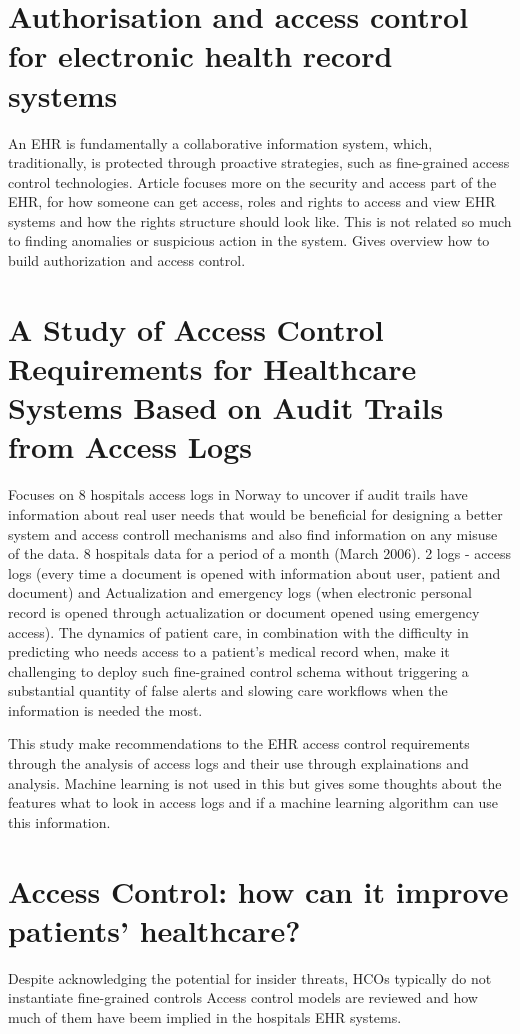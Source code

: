 \documentclass[12pt]{article}
\begin{document}
\section{Authorisation and access control for electronic health record systems}
An EHR is fundamentally a collaborative information system, which, traditionally, is protected through proactive strategies, such as fine-grained access control technologies. \cite{BLOBEL2004251} 
Article focuses more on the security and access part of the EHR, for how someone can get access, roles and rights to access and view EHR systems and how the rights structure should look like. This is not related so much to finding anomalies or suspicious action in the system. Gives overview how to build authorization and access control.  

\section{A Study of Access Control Requirements for Healthcare Systems Based on Audit Trails from Access Logs}
Focuses on 8 hospitals access logs in Norway to uncover if audit trails have information about real user needs that would be beneficial for designing a better system and access controll mechanisms and also find information on any misuse of the data.
8 hospitals data for a period of a month (March 2006).
2 logs - access logs (every time a document is opened with information about user, patient and document) and Actualization and emergency logs (when electronic personal record is opened through actualization or document opened using emergency access).
The dynamics of patient care, in combination with the difficulty in predicting who needs access to a patient’s medical record when, make it challenging to deploy such fine-grained control schema without
triggering a substantial quantity of false alerts and slowing care workflows when the information is needed the most. \cite{4041165}  

This study make recommendations to the EHR access control requirements through the analysis of access logs and their use through explainations and analysis. Machine learning is not used in this but gives some thoughts about the features what to look in access logs and if a machine learning algorithm can use this information.  

\section{Access Control: how can it improve	patients’ healthcare?}
Despite acknowledging the potential for insider threats, HCOs typically do not instantiate fine-grained controls \cite{ferreiraabd2007access}  
Access control models are reviewed and how much of them have beem implied in the hospitals EHR systems. 
\end{document}
